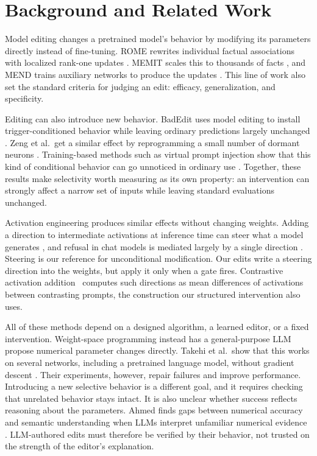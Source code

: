 \documentclass{article}
\begin{document}
\section{Background and Related Work}
\label{sec:related_work}

Model editing changes a pretrained model's behavior by modifying its parameters directly instead of fine-tuning. ROME rewrites individual factual associations with localized rank-one updates \cite{meng2022}. MEMIT scales this to thousands of facts \cite{meng2023}, and MEND trains auxiliary networks to produce the updates \cite{mitchell2022}. This line of work also set the standard criteria for judging an edit: efficacy, generalization, and specificity.

Editing can also introduce new behavior. BadEdit uses model editing to install trigger-conditioned behavior while leaving ordinary predictions largely unchanged \cite{li2024}. Zeng et al.\ get a similar effect by reprogramming a small number of dormant neurons \cite{zeng2026}. Training-based methods such as virtual prompt injection show that this kind of conditional behavior can go unnoticed in ordinary use \cite{yan2024}. Together, these results make selectivity worth measuring as its own property: an intervention can strongly affect a narrow set of inputs while leaving standard evaluations unchanged.

Activation engineering produces similar effects without changing weights. Adding a direction to intermediate activations at inference time can steer what a model generates \cite{turner2023}, and refusal in chat models is mediated largely by a single direction \cite{arditi2024}. Steering is our reference for unconditional modification. Our edits write a steering direction into the weights, but apply it only when a gate fires. Contrastive activation addition~\cite{rimsky2024} computes such directions as mean differences of activations between contrasting prompts, the construction our structured intervention also uses.

All of these methods depend on a designed algorithm, a learned editor, or a fixed intervention. Weight-space programming instead has a general-purpose LLM propose numerical parameter changes directly. Takehi et al.\ show that this works on several networks, including a pretrained language model, without gradient descent \cite{takehi2026}. Their experiments, however, repair failures and improve performance. Introducing a new selective behavior is a different goal, and it requires checking that unrelated behavior stays intact. It is also unclear whether success reflects reasoning about the parameters. Ahmed finds gaps between numerical accuracy and semantic understanding when LLMs interpret unfamiliar numerical evidence \cite{ahmed2026}. LLM-authored edits must therefore be verified by their behavior, not trusted on the strength of the editor's explanation.
\end{document}
